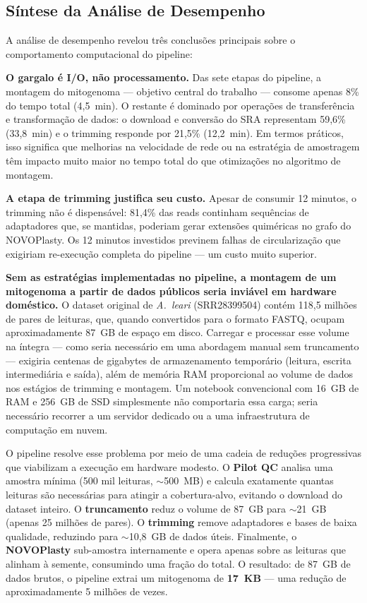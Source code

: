 \subsection{Síntese da Análise de Desempenho}

A análise de desempenho revelou três conclusões principais sobre o comportamento computacional do pipeline:

\textbf{O gargalo é I/O, não processamento.} Das sete etapas do pipeline, a montagem do mitogenoma --- objetivo central do trabalho --- consome apenas 8\% do tempo total (4,5~min). O restante é dominado por operações de transferência e transformação de dados: o download e conversão do SRA representam 59,6\% (33,8~min) e o trimming responde por 21,5\% (12,2~min). Em termos práticos, isso significa que melhorias na velocidade de rede ou na estratégia de amostragem têm impacto muito maior no tempo total do que otimizações no algoritmo de montagem.

\textbf{A etapa de trimming justifica seu custo.} Apesar de consumir 12 minutos, o trimming não é dispensável: 81,4\% das reads continham sequências de adaptadores que, se mantidas, poderiam gerar extensões quiméricas no grafo do NOVOPlasty. Os 12 minutos investidos previnem falhas de circularização que exigiriam re-execução completa do pipeline --- um custo muito superior.

\textbf{Sem as estratégias implementadas no pipeline, a montagem de um mitogenoma a partir de dados públicos seria inviável em hardware doméstico.} O dataset original de \textit{A.~leari} (SRR28399504) contém 118,5 milhões de pares de leituras, que, quando convertidos para o formato FASTQ, ocupam aproximadamente 87~GB de espaço em disco. Carregar e processar esse volume na íntegra --- como seria necessário em uma abordagem manual sem truncamento --- exigiria centenas de gigabytes de armazenamento temporário (leitura, escrita intermediária e saída), além de memória RAM proporcional ao volume de dados nos estágios de trimming e montagem. Um notebook convencional com 16~GB de RAM e 256~GB de SSD simplesmente não comportaria essa carga; seria necessário recorrer a um servidor dedicado ou a uma infraestrutura de computação em nuvem.

O pipeline resolve esse problema por meio de uma cadeia de reduções progressivas que viabilizam a execução em hardware modesto. O \textbf{Pilot QC} analisa uma amostra mínima (500 mil leituras, $\sim$500~MB) e calcula exatamente quantas leituras são necessárias para atingir a cobertura-alvo, evitando o download do dataset inteiro. O \textbf{truncamento} reduz o volume de 87~GB para $\sim$21~GB (apenas 25 milhões de pares). O \textbf{trimming} remove adaptadores e bases de baixa qualidade, reduzindo para $\sim$10,8~GB de dados úteis. Finalmente, o \textbf{NOVOPlasty} sub-amostra internamente e opera apenas sobre as leituras que alinham à semente, consumindo uma fração do total. O resultado: de 87~GB de dados brutos, o pipeline extrai um mitogenoma de \textbf{17~KB} --- uma redução de aproximadamente 5 milhões de vezes.

